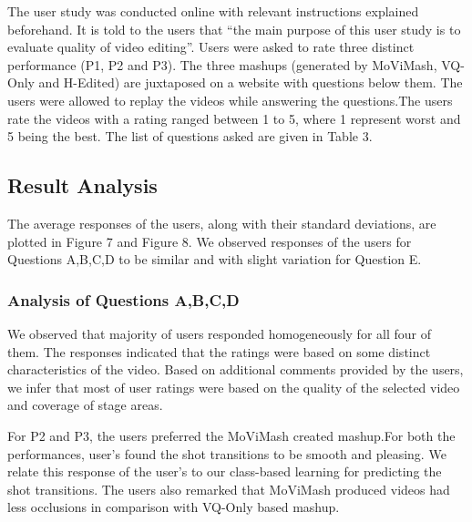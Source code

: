 \documentclass{sig-alternate}
\begin{document}
The user study was conducted online with relevant instructions explained beforehand. It is told to the users that “the main purpose of this user study is to evaluate quality of video editing”. Users were asked to rate three distinct performance (P1, P2 and P3). The three mashups (generated by MoViMash, VQ-Only and H-Edited) are juxtaposed on a website with questions below them. The users were allowed to replay the videos while answering the questions.The users rate the videos with a rating ranged between 1 to 5, where 1 represent worst and 5 being the best. The list of questions asked are given in Table 3.

\subsection{Result Analysis}
The average responses of the users, along with their standard deviations, are plotted in Figure 7 and Figure 8. We observed responses of the users for Questions A,B,C,D to be similar and with slight variation for Question E.
\subsubsection{Analysis of Questions A,B,C,D}
We observed that majority of users responded homogeneously for all four of them. The responses indicated that the ratings were based on some distinct characteristics of the video. Based on additional comments provided by the users, we infer that most of user ratings were based on the quality of the selected video and coverage of stage areas.

For P2 and P3, the users preferred the MoViMash created mashup.For both the performances, user’s found the shot transitions to be smooth and pleasing. We relate this response of the user’s to our class-based learning for predicting the shot transitions. The users also remarked that MoViMash produced videos had less occlusions in comparison with VQ-Only based mashup.
\end{document}
